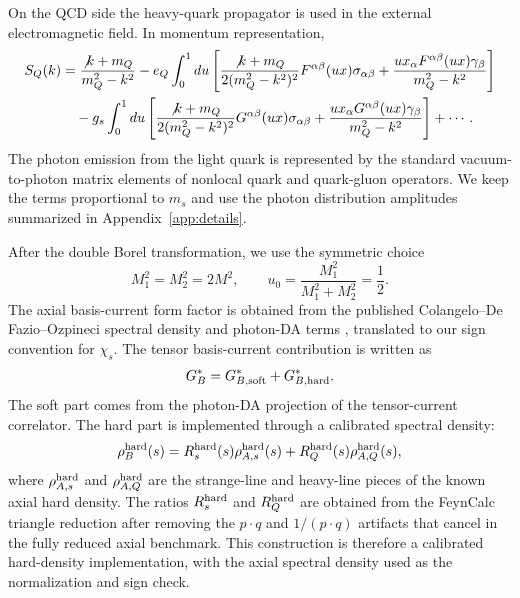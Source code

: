 \documentclass[aps,prd,a4paper,preprint,preprintnumbers,titlepage,
nofootinbib,superscriptaddress]{revtex4-2}
\begin{document}
On the QCD side the heavy-quark propagator is used in the external
electromagnetic field.  In momentum representation,
\begin{align}
  S_Q(k) &=
  \frac{\not k+m_Q}{m_Q^2-k^2}
  -e_Q\int_0^1du
  \left[
  \frac{\not k+m_Q}{2(m_Q^2-k^2)^2}
  F^{\alpha\beta}(ux)\sigma_{\alpha\beta}
  +\frac{u x_\alpha F^{\alpha\beta}(ux)\gamma_\beta}{m_Q^2-k^2}
  \right]\notag\\
  &\quad
  -g_s\int_0^1du
  \left[
  \frac{\not k+m_Q}{2(m_Q^2-k^2)^2}
  G^{\alpha\beta}(ux)\sigma_{\alpha\beta}
  +\frac{u x_\alpha G^{\alpha\beta}(ux)\gamma_\beta}{m_Q^2-k^2}
  \right]+\cdots .
  \label{eq:heavy-propagator}
\end{align}
The photon emission from the light quark is represented by the standard
vacuum-to-photon matrix elements of nonlocal quark and quark-gluon operators.
We keep the terms proportional to \(m_s\) and use the photon distribution
amplitudes summarized in Appendix~\ref{app:details}.

After the double Borel transformation, we use the symmetric choice
\begin{equation}
  M_1^2=M_2^2=2M^2,\qquad
  u_0=\frac{M_1^2}{M_1^2+M_2^2}=\frac12 .
  \label{eq:borel-choice}
\end{equation}
The axial basis-current form factor is obtained from the published
Colangelo--De Fazio--Ozpineci spectral density and photon-DA terms
\cite{Colangelo:2005hv}, translated to our sign convention for
\(\chi_s\).  The tensor basis-current contribution is written as
\begin{equation}
  G_B^\ast=G_{B,{\rm soft}}^\ast+G_{B,{\rm hard}}^\ast .
  \label{eq:gb-split}
\end{equation}
The soft part comes from the photon-DA projection of the tensor-current
correlator.  The hard part is implemented through a calibrated spectral
density:
\begin{equation}
  \rho_B^{\rm hard}(s)
  =
  R_s^{\rm hard}(s)\rho_{A,s}^{\rm hard}(s)
  +R_Q^{\rm hard}(s)\rho_{A,Q}^{\rm hard}(s),
  \label{eq:calibrated-rho}
\end{equation}
where \(\rho_{A,s}^{\rm hard}\) and \(\rho_{A,Q}^{\rm hard}\) are the
strange-line and heavy-line pieces of the known axial hard density.  The
ratios \(R_s^{\rm hard}\) and \(R_Q^{\rm hard}\) are obtained from the
FeynCalc triangle reduction after removing the \(p\cdot q\) and
\(1/(p\cdot q)\) artifacts that cancel in the fully reduced axial benchmark.
This construction is therefore a calibrated hard-density implementation,
with the axial spectral density used as the normalization and sign check.
\end{document}
